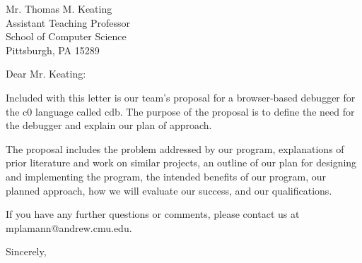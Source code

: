 \documentclass[11pt]{letter}
\begin{document}
\begin{letter}{Mr. Thomas M. Keating \\
    Assistant Teaching Professor \\
    School of Computer Science \\
    Pittsburgh, PA 15289}

\opening{Dear Mr. Keating:}

Included with this letter is our team's proposal for a browser-based debugger
for the c0 language called cdb. %
The purpose of the proposal is to define the need for the debugger and explain 
our plan of approach.

The proposal includes the problem addressed by our program,
explanations of prior literature and work on similar projects,
an outline of our plan for designing and implementing the program,
the intended benefits of our program,
our planned approach,
how we will evaluate our success,
and our qualifications.

If you have any further questions or comments, please contact us at
mplamann@andrew.cmu.edu.

\closing{Sincerely,}


\end{letter}
\end{document}
